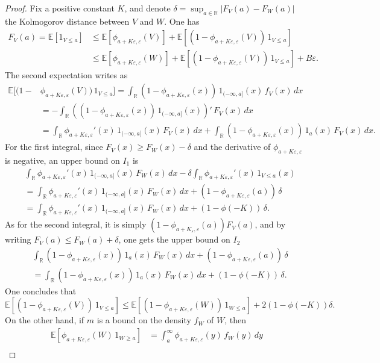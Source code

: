 \documentclass[12pt,a4paper,reqno]{amsart}
\newcommand{\R}{\mathbb{R}}
\newcommand{\esper}{\mathbb{E}}
\newcommand{\eps}{\varepsilon}
\theoremstyle{remark}
\begin{document}
\begin{proof}
Fix a positive constant $K$, and denote $\delta=\sup_{a \in \R}|F_V(a)-F_W(a)|$ the Kolmo\-go\-rov distance between $V$ and $W$. One has
\begin{align*}F_V(a) = \esper[1_{V \leq a}] &\leq \esper[\phi_{a+K\eps,\eps}(V)] + \esper[(1-\phi_{a+K\eps,\eps}(V))\,1_{V \leq a}]\\
&\leq \esper[\phi_{a+K\eps,\eps}(W)] + \esper[(1-\phi_{a+K\eps,\eps}(V))\,1_{V \leq a}] + B\eps.
\end{align*}
The second expectation writes as
\begin{align*}
\esper[(1-&\phi_{a+K\eps,\eps}(V))\,1_{V \leq a}]=\int_{\R} (1-\phi_{a+K\eps,\eps}(x))\,1_{(-\infty,a]}(x)\, f_V(x)\,dx\\
&=-\int_{\R} ((1-\phi_{a+K\eps,\eps}(x))\,1_{(-\infty,a]}(x))'\, F_V(x)\,dx\\
&=\int_{\R} \phi_{a+K\eps,\eps}'(x)\,1_{(-\infty,a]}(x)\, F_V(x)\,dx+\int_{\R} (1-\phi_{a+K\eps,\eps}(x))\,1_a(x)\, F_V(x)\,dx.
\end{align*}
For the first integral, since $F_V(x)\geq F_W(x)-\delta$ and the derivative of $\phi_{a+K\eps,\eps}$ is negative, an upper bound on $I_1$ is
\begin{align*}& \int_{\R} \phi_{a+K\eps,\eps}'(x)\,1_{(-\infty,a]}(x)\, F_W(x)\,dx - \delta\int_{\R}\phi_{a+K\eps,\eps}'(x)\,1_{V \leq a}(x) \\
&= \int_{\R} \phi_{a+K\eps,\eps}'(x)\,1_{(-\infty,a]}(x)\, F_W(x)\,dx +  (1-\phi_{a+K\eps,\eps}(a))\,\delta\\
&=\int_{\R} \phi_{a+K\eps,\eps}'(x)\,1_{(-\infty,a]}(x)\, F_W(x)\,dx + (1-\phi(-K))\,\delta.
\end{align*}
As for the second integral, it is simply $(1-\phi_{a+K_\eps,\eps}(a)) F_V(a)$, and by writing $F_V(a) \leq F_W(a)+\delta$, one gets the upper bound on $I_2$
\begin{align*}
&\int_{\R} (1-\phi_{a+K\eps,\eps}(x))\,1_a(x)\, F_W(x)\,dx + (1-\phi_{a+K\eps,\eps}(a))\,\delta \\
&=\int_{\R} (1-\phi_{a+K\eps,\eps}(x))\,1_a(x)\, F_W(x)\,dx + (1-\phi(-K))\,\delta .
\end{align*}
One concludes that 
$$\esper[(1-\phi_{a+K\eps,\eps}(V))\,1_{V \leq a}]\leq \esper[(1-\phi_{a+K\eps,\eps}(W))\,1_{W \leq a}]+2 (1-\phi(-K))\delta.$$
On the other hand, if $m$ is a bound on the density $f_W$ of $W$, then
\begin{align*}\esper[\phi_{a+K\eps,\eps}(W)\,1_{W \geq a}] &= \int_a^{\infty} \phi_{a+K\eps,\eps}(y)\,f_W(y)\,dy\\

\end{align*}
\end{proof}
\end{document}
